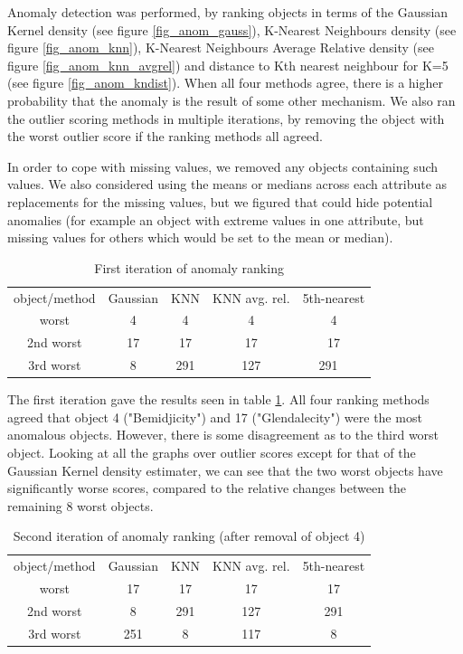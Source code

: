 \documentclass[a4paper,10pt]{article}
\begin{document}
Anomaly detection was performed, by ranking objects in terms of the Gaussian Kernel density (see figure \ref{fig_anom_gauss}), K-Nearest Neighbours density (see figure \ref{fig_anom_knn}), K-Nearest Neighbours Average Relative density (see figure \ref{fig_anom_knn_avgrel}) and distance to Kth nearest neighbour for K=5 (see figure \ref{fig_anom_kndist}). When all four methods agree, there is a higher probability that the anomaly is the result of some other mechanism. We also ran the outlier scoring methods in multiple iterations, by removing the object with the worst outlier score if the ranking methods all agreed.

In order to cope with missing values, we removed any objects containing such values. We also considered using the means or medians across each attribute as replacements for the missing values, but we figured that could hide potential anomalies (for example an object with extreme values in one attribute, but missing values for others which would be set to the mean or median). 

\begin{table}[H]
\centering
\begin{tabular}{c | c c c c}
  object/method & Gaussian & KNN & KNN avg. rel. & 5th-nearest \\
  worst & 4 & 4 & 4 & 4 \\
  2nd worst & 17 & 17 & 17 & 17 \\
  3rd worst & 8 & 291 & 127 & 291 \
\end{tabular}
\caption{First iteration of anomaly ranking}
\label{table_ite1}
\end{table}

The first iteration gave the results seen in table \ref{table_ite1}. All four ranking methods agreed that object 4 ("Bemidjicity") and 17 ("Glendalecity") were the most anomalous objects. However, there is some disagreement as to the third worst object. Looking at all the graphs over outlier scores except for that of the Gaussian Kernel density estimater, we can see that the two worst objects have significantly worse scores, compared to the relative changes between the remaining 8 worst objects.


\begin{table}[H]
\centering
\begin{tabular}{c | c c c c}
  object/method
        & Gaussian
                & KNN
                        & KNN avg. rel.
                          & 5th-nearest \\
  worst     & 17  & 17  & 17  & 17   \\
  2nd worst & 8   & 291 & 127 & 291  \\
  3rd worst & 251 & 8   & 117 & 8
\end{tabular}
\caption{Second iteration of anomaly ranking (after removal of object 4)}
\label{table_ite2}
\end{table}
\end{document}
